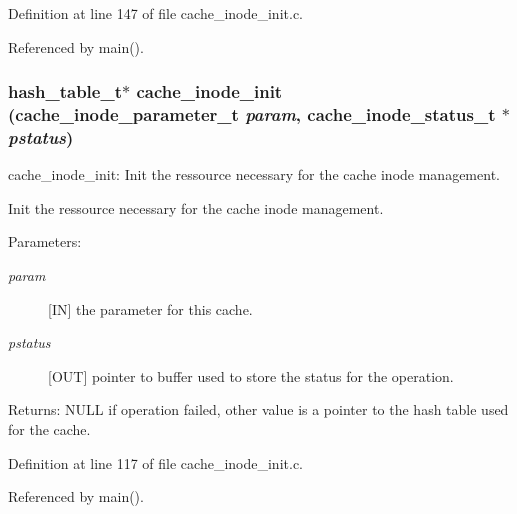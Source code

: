 Definition at line 147 of file cache\_\-inode\_\-init.c.

Referenced by main().
\subsubsection{\setlength{\rightskip}{0pt plus 5cm}hash\_\-table\_\-t$\ast$ cache\_\-inode\_\-init (cache\_\-inode\_\-parameter\_\-t {\em param}, cache\_\-inode\_\-status\_\-t $\ast$ {\em pstatus})}\label{cache__inode__init_8c_a0}


cache\_\-inode\_\-init: Init the ressource necessary for the cache inode management.

Init the ressource necessary for the cache inode management.

\begin{Desc}
\item[Parameters:]
\begin{description}
\item[{\em param}][IN] the parameter for this cache. \item[{\em pstatus}][OUT] pointer to buffer used to store the status for the operation.\end{description}
\end{Desc}
\begin{Desc}
\item[Returns:]NULL if operation failed, other value is a pointer to the hash table used for the cache. \end{Desc}


Definition at line 117 of file cache\_\-inode\_\-init.c.

Referenced by main().